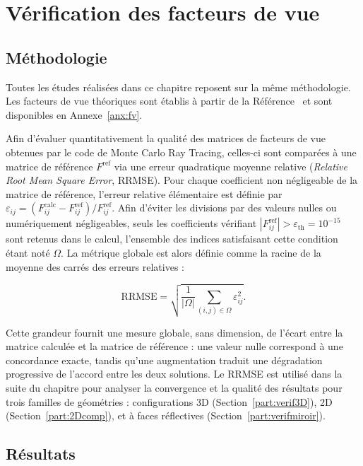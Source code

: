 

\section{Vérification des facteurs de vue}

\subsection{Méthodologie}

Toutes les études réalisées dans ce chapitre reposent sur la même méthodologie. Les facteurs de vue théoriques sont établis à partir de la Référence~\cite{howell} et sont disponibles en Annexe~\ref{anx:fv}.

Afin d'évaluer quantitativement la qualité des matrices de facteurs de vue obtenues par le code de Monte Carlo Ray Tracing, celles-ci sont comparées à une matrice de référence $F^{\mathrm{ref}}$ via une erreur quadratique moyenne relative (\textit{Relative Root Mean Square Error}, RRMSE). Pour chaque coefficient non négligeable de la matrice de référence, l'erreur relative élémentaire est définie par $\varepsilon_{ij} = (F_{ij}^{\mathrm{calc}} - F_{ij}^{\mathrm{ref}})/F_{ij}^{\mathrm{ref}}$. Afin d'éviter les divisions par des valeurs nulles ou numériquement négligeables, seuls les coefficients vérifiant $\left|F_{ij}^{\mathrm{ref}}\right| > \varepsilon_{\mathrm{th}} = 10^{-15}$ sont retenus dans le calcul, l'ensemble des indices satisfaisant cette condition étant noté $\Omega$. La métrique globale est alors définie comme la racine de la moyenne des carrés des erreurs relatives :

\begin{equation}
\mathrm{RRMSE} = \sqrt{\frac{1}{|\Omega|} \sum_{(i,j)\in \Omega} \varepsilon_{ij}^{2}}.
\label{eq:rrmse}
\end{equation}

Cette grandeur fournit une mesure globale, sans dimension, de l'écart entre la matrice calculée et la matrice de référence : une valeur nulle correspond à une concordance exacte, tandis qu'une augmentation traduit une dégradation progressive de l'accord entre les deux solutions. Le RRMSE est utilisé dans la suite du chapitre pour analyser la convergence et la qualité des résultats pour trois familles de géométries : configurations 3D (Section~\ref{part:verif3D}), 2D (Section~\ref{part:2Dcomp}), et à faces réflectives (Section~\ref{part:verifmiroir}).

\subsection{Résultats}

